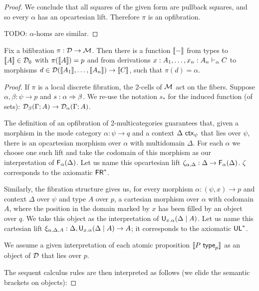 \begin{proof}
We conclude that all squares of the given form are pullback squares, and so every $\alpha$ has an opcartesian lift. Therefore $\pi$ is an opfibration.

TODO: $\alpha$-homs are similar.
\end{proof}

\begin{theorem}
Fix a bifibration $\pi : \mathcal{D} \to \mathcal{M}$.  Then there is a function $\llbracket -
\rrbracket$ from types  to $\llbracket A \rrbracket \in \mathcal{D}_0$ with $\pi(\llbracket
A \rrbracket) = p$ and from derivations $x:A_1, \ldots,
  x_n:A_n \vdash_{\alpha} C$ to morphisms $d \in \mathcal{D}(\llbracket A_1 \rrbracket, \dots, \llbracket
A_n \rrbracket) \to \llbracket C \rrbracket$, such that $\pi(d) = \alpha$.
\end{theorem}

\begin{proof}
If $\pi$ is a local discrete fibration, the 2-cells of $\mathcal{M}$ act on the
fibers. Suppose $\alpha, \beta : \psi \to p$ and $s : \alpha \Rightarrow
\beta$. We re-use the notation $s_*$ for the induced function (of sets):
$\mathcal{D}_\beta(\Gamma; A) \to \mathcal{D}_\alpha(\Gamma; A)$.  

The definition of an opfibration of 2-multicategories guarantees that,
given a morphism in the mode category $\alpha : \psi \to q$ and a
context $\Delta \,\, \mathsf{ctx}_{\psi}$ that lies over $\psi$, there is an
opcartesian morphism over $\alpha$ with multidomain $\Delta$. For each
$\alpha$ we choose one such lift and take the codomain of this morphism
as our interpretation of $\mathsf{F}_{\alpha}(\Delta)$. Let us name this
opcartesian lift $\zeta_{\alpha, \Delta} : \Delta \to
\mathsf{F}_{\alpha}(\Delta)$. $\zeta$ corresponds to the axiomatic $\mathsf{FR}^*$.

Similarly, the fibration structure gives us, for every morphism $\alpha
: (\psi,x) \to p$ and context $\Delta$ over $\psi$ and type $A$ over
$p$, a cartesian morphism over $\alpha$ with codomain $A$, where the
position in the domain marked by $x$ has been filled by an object over
$q$. We take this object as the interpretation of
$\mathsf{U}_{x.\alpha}(\Delta \mid A)$.  Let us name this cartesian lift
$\xi_{\alpha, \Delta,A} : \Delta,\mathsf{U}_{x.\alpha}(\Delta \mid A) \to A$; it
corresponds to the axiomatic $\mathsf{UL}^*$.  

We assume a given interpretation of each atomic proposition $\llbracket
P \,\, \mathsf{type}_{p} \rrbracket$ as an object of $\mathcal{D}$ that lies over $p$.

The sequent calculus rules are then interpreted as follows (we elide the
semantic brackets on objects):


\end{proof}
